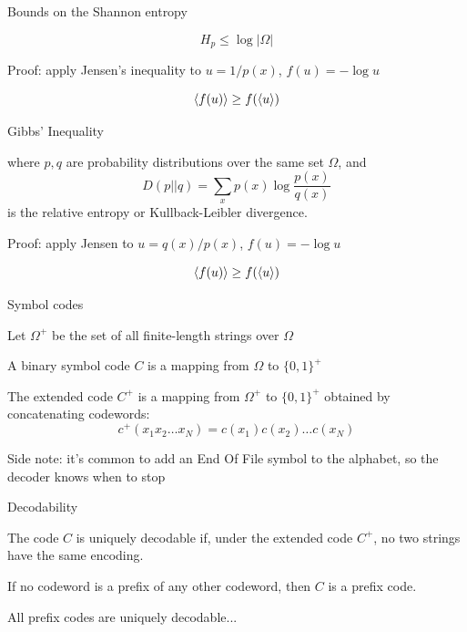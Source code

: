 \documentclass{beamer}
\begin{document}
\begin{frame}{Bounds on the Shannon entropy}


\[
H_p \leq \log |\Omega|
\]

Proof: apply Jensen's inequality to $u=1/p(x)$, $f(u)=-\log u$

\[
\langle f(u) \rangle \geq f(\langle u \rangle)
\]


\end{frame}

\begin{frame}{Gibbs' Inequality}

\centerline{}

where $p,q$ are probability distributions over the same set $\Omega$, and
\[
D(p||q) = \sum_x p(x) \log \frac{p(x)}{q(x)}
\]
is the \alert{relative entropy} or \alert{Kullback-Leibler divergence}.

Proof: apply Jensen to $u=q(x)/p(x)$, $f(u)=-\log u$

\[
\langle f(u) \rangle \geq f(\langle u \rangle)
\]

\end{frame}

\begin{frame}{Symbol codes}

\itemb
\item Let $\Omega^+$ be the set of all finite-length strings over $\Omega$
\item A \alert{binary symbol code} $C$ is a mapping from $\Omega$ to $\{0,1\}^+$
\item The \alert{extended code} $C^+$ is a mapping from ${\Omega}^+$ to $\{0,1\}^+$
obtained by concatenating codewords:
\[
       c^+(x_1 x_2 \ldots x_N) = c(x_1)c(x_2)\ldots c(x_N)
\]
\item Side note: it's common to add an \alert{End Of File} symbol to the alphabet, so the decoder knows when to stop
\iteme

\end{frame}


\begin{frame}{Decodability}

\itemb
\item The code $C$ is \alert{uniquely decodable} if, under the extended code $C^+$,
no two strings have the same encoding.
\item If no codeword is a prefix of any other codeword,
then $C$ is a \alert{prefix code}.
\item All prefix codes are uniquely decodable...
\iteme

\end{frame}
\end{document}
